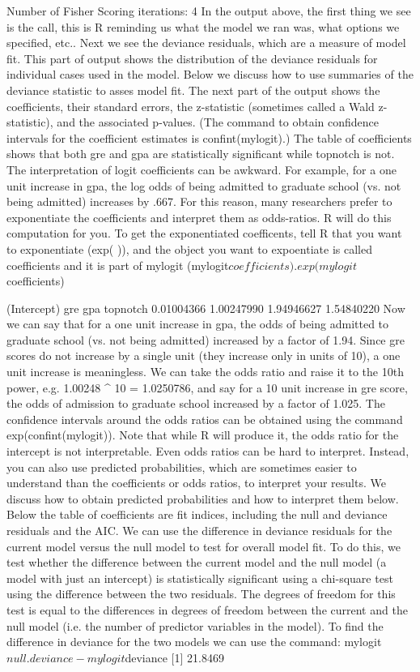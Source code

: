 Number of Fisher Scoring iterations: 4
In the output above, the first thing we see is the call, this is R reminding us what the model we ran was, what options we specified, etc.. Next we see the deviance residuals, which are a measure of model fit. This part of output shows the distribution of the deviance residuals for individual cases used in the model. Below we discuss how to use summaries of the deviance statistic to asses model fit.
The next part of the output shows the coefficients, their standard errors, the z-statistic (sometimes called a Wald z-statistic), and the associated p-values. (The command to obtain confidence intervals for the coefficient estimates is confint(mylogit).) The table of coefficients shows that both gre and gpa are statistically significant while topnotch is not. The interpretation of logit coefficients can be awkward. For example, for a one unit increase in gpa, the log odds of being admitted to graduate school (vs. not being admitted) increases by .667. For this reason, many researchers prefer to exponentiate the coefficients and interpret them as odds-ratios. R will do this computation for you. To get the exponentiated coefficents, tell R that you want to exponentiate (exp( )), and the object you want to expoentiate is called coefficients and it is part of mylogit (mylogit$coefficients).
exp(mylogit$coefficients)
  
(Intercept)         gre         gpa    topnotch 
 0.01004366  1.00247990  1.94946627  1.54840220 
Now we can say that for a one unit increase in gpa, the odds of being admitted to graduate school (vs. not being admitted) increased by a factor of 1.94. Since gre scores do not increase by a single unit (they increase only in units of 10), a one unit increase is meaningless. We can take the odds ratio and raise it to the 10th power, e.g. 1.00248 ^ 10 = 1.0250786, and say for a 10 unit increase in gre score, the odds of admission to graduate school increased by a factor of 1.025. The confidence intervals around the odds ratios can be obtained using the command exp(confint(mylogit)). Note that while R will produce it, the odds ratio for the intercept is not interpretable.
Even odds ratios can be hard to interpret. Instead, you can also use predicted probabilities, which are sometimes easier to understand than the coefficients or odds ratios, to interpret your results. We discuss how to obtain predicted probabilities and how to interpret them below.
Below the table of coefficients are fit indices, including the null and deviance residuals and the AIC. We can use the difference in deviance residuals for the current model versus the null model to test for overall model fit. To do this, we test whether the difference between the current model and the null model (a model with just an intercept) is statistically significant using a chi-square test using the difference between the two residuals. The degrees of freedom for this test is equal to the differences in degrees of freedom between the current and the null model (i.e. the number of predictor variables in the model). To find the difference in deviance for the two models we can use the command:
mylogit$null.deviance-mylogit$deviance
[1] 21.8469
	
